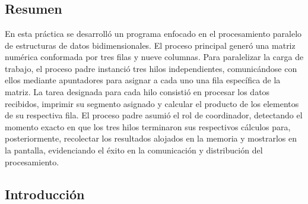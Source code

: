 %
%
%
%

\chapter{\TituloPracTres}
\label{prac:03}

\section{Resumen}
\label{sec:prac03:resumen}

En esta práctica se desarrolló un programa enfocado en el procesamiento paralelo de estructuras de datos bidimensionales. El proceso principal generó una matriz numérica conformada por tres filas y nueve columnas. Para paralelizar la carga de trabajo, el proceso padre instanció tres hilos independientes, comunicándose con ellos mediante apuntadores para asignar a cada uno una fila específica de la matriz. La tarea designada para cada hilo consistió en procesar los datos recibidos, imprimir su segmento asignado y calcular el producto de los elementos de su respectiva fila. El proceso padre asumió el rol de coordinador, detectando el momento exacto en que los tres hilos terminaron sus respectivos cálculos para, posteriormente, recolectar los resultados alojados en la memoria y mostrarlos en la pantalla, evidenciando el éxito en la comunicación y distribución del procesamiento.

\section{Introducción}
\label{sec:prac03:introduccion}

